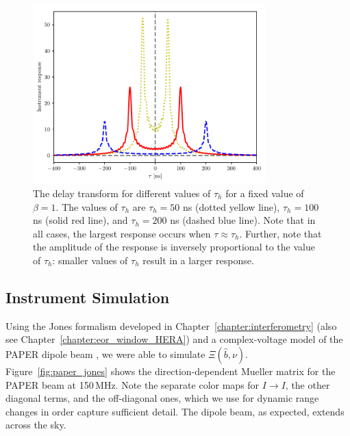 \begin{figure}
\centering
\includegraphics[width=0.8\textwidth]{chapters/global_signal/figures/vg_th.pdf}
\caption[The delay transform for different values of $\tau_h$.]{
    The delay transform for different values of $\tau_h$ for a fixed
    value of $\beta = 1$. The values of $\tau_h$ are $\tau_h = 50$ ns (dotted
    yellow line), $\tau_h = 100$ ns (solid red line), and $\tau_h = 200$ ns
    (dashed blue line). Note that in all cases, the largest response occurs when
    $\tau \approx \tau_h$. Further, note that the amplitude of the response is
    inversely proportional to the value of $\tau_h$: smaller values of $\tau_h$
    result in a larger response.}
\label{fig:vg_tau_three}
\end{figure}

\subsection{Instrument Simulation}
Using the Jones formalism developed in Chapter~\ref{chapter:interferometry} (also see Chapter~\ref{chapter:eor_window_HERA}) and a complex-voltage model of the PAPER \citep[e.g.][]{Parsons.10} dipole beam \citep{Pober.12}, we were able to simulate $\Xi(\hat{b},\nu)$. Figure~\ref{fig:paper_jones} shows the direction-dependent Mueller matrix for the PAPER beam at 150\,MHz. Note the separate color maps for $I\rightarrow I$, the other diagonal terms, and the off-diagonal ones, which we use for dynamic range changes in order capture sufficient detail. The dipole beam, as expected, extends across the sky.


